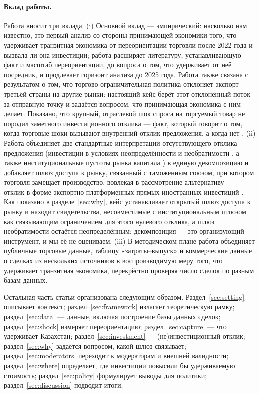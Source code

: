 \documentclass[12pt]{article}
\begin{document}
\paragraph{Вклад работы.} Работа вносит три вклада. (i) Основной вклад — эмпирический: насколько
нам известно, это первый анализ со стороны принимающей экономики того, что удерживает
транзитная экономика от переориентации торговли после 2022 года и вызвала ли она
инвестиции; работа расширяет литературу, устанавливающую факт и масштаб переориентации, до
вопроса о том, что удерживает от неё посредник, и продлевает горизонт анализа до 2025 года.
Работа также связана с результатом \citet{bowncrowley2007} о том, что
торгово-ограничительная политика отклоняет экспорт третьей страны на другие рынки:
настоящий кейс берёт этот отклонённый поток за отправную точку и задаётся вопросом, что
принимающая экономика с ним делает. Показано, что крупный, отраслевой шок спроса на
торгуемый товар не породил заметного инвестиционного отклика — факт, который говорит о
том, когда торговые шоки вызывают внутренний отклик предложения, а когда нет
\citep{juhasz2018temporary,bloom2016trade,juhaszlanerodrik2024,gopinathneiman2014}. (ii)
Работа объединяет две стандартные интерпретации отсутствующего отклика предложения
(инвестиции в условиях неопределённости и необратимости
\citep{dixitpindyck1994,handleylimao2015,handleylimao2017}, а также институциональные
пустоты рынка капитала \citep{khanna1997,khannapalepu2000,rajanzingales1998}) в единую
декомпозицию и добавляет шлюз доступа к рынку, связанный с таможенным союзом, при котором
торговля замещает производство, вовлекая в рассмотрение альтернативу — отклик в форме
экспортно-платформенных прямых иностранных инвестиций
\citep{brainard1997,helpmanmelitzyeaple2004,ekholmforslidmarkusen2007}. Как показано в
разделе~\ref{sec:why}, кейс устанавливает открытый шлюз доступа к рынку и находит
свидетельства, несовместимые с институциональным шлюзом как связывающим ограничением для
этого нулевого отклика, а шлюз необратимости остаётся неопределённым; декомпозиция — это
организующий инструмент, и мы её не оцениваем. (iii) В методическом плане работа объединяет
публичные торговые данные, таблицу «затраты--выпуск» и коммерческие данные о сделках из
нескольких источников в воспроизводимую меру того, что удерживает транзитная экономика,
перекрёстно проверяя число сделок по разным базам данных.

Остальная часть статьи организована следующим образом. Раздел~\ref{sec:setting} описывает
контекст; раздел~\ref{sec:framework} излагает теоретическую рамку;
раздел~\ref{sec:data} — данные, включая построение базы данных сделок;
раздел~\ref{sec:shock} измеряет переориентацию; раздел~\ref{sec:capture} — что удерживает
Казахстан; раздел~\ref{sec:investment} — (не)инвестиционный отклик;
раздел~\ref{sec:why} задаётся вопросом, какой шлюз связывает; раздел~\ref{sec:moderators}
переходит к модераторам и внешней валидности; раздел~\ref{sec:where} определяет, где
инвестиции повысили бы удерживаемую стоимость; раздел~\ref{sec:policy} формулирует выводы
для политики; раздел~\ref{sec:discussion} подводит итоги.
\end{document}
